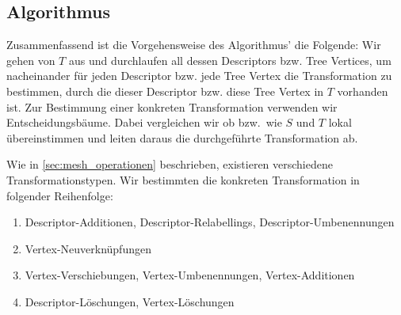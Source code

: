 

\subsection{Algorithmus}
Zusammenfassend ist die Vorgehensweise des Algorithmus' die Folgende: Wir gehen von $T$ aus und durchlaufen all dessen Descriptors bzw. Tree Vertices, um nacheinander für jeden Descriptor bzw. jede Tree Vertex die Transformation zu bestimmen, durch die dieser Descriptor bzw. diese Tree Vertex in $T$ vorhanden ist. Zur Bestimmung einer konkreten Transformation verwenden wir Entscheidungsbäume. Dabei vergleichen wir ob bzw.\ wie $S$ und $T$ lokal übereinstimmen und leiten daraus die durchgeführte Transformation ab. \par


Wie in \ref{sec:mesh_operationen} \textit{} beschrieben, existieren verschiedene Transformationstypen. Wir bestimmten die konkreten Transformation in folgender Reihenfolge:
\begin{enumerate}
  \item Descriptor-Additionen, Descriptor-Relabellings, Descriptor-Umbenennungen
  \item Vertex-Neuverknüpfungen
  \item Vertex-Verschiebungen, Vertex-Umbenennungen, Vertex-Additionen
  \item Descriptor-Löschungen, Vertex-Löschungen
\end{enumerate} 

